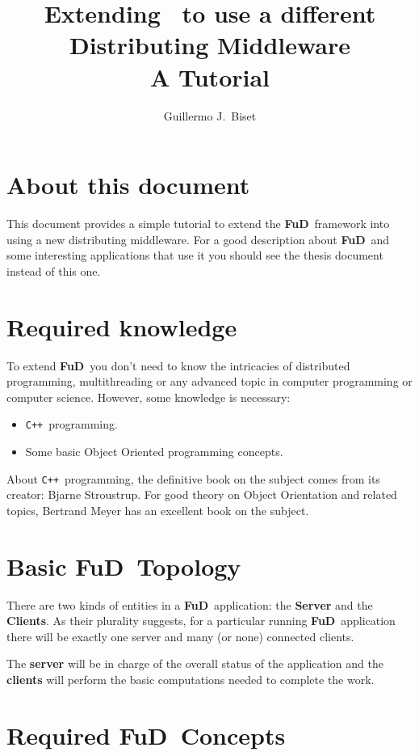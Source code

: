 \documentclass[a4paper,12pt,english]{article}
\title{Extending \fud \ to use a different Distributing Middleware\\ \small{A Tutorial}}
\author{Guillermo J.~Biset}
\newcommand{\fud}{\textbf{FuD}}
\newcommand{\cpp}{\texttt{C++}}
\begin{document}
\maketitle

\section{About this document}

This document provides a simple tutorial to extend the \fud \ framework into using a new distributing middleware. For a good description about \fud  \ and some interesting applications that use it you should see the thesis document instead of this one.

\section{Required knowledge}
To extend \fud \ you don't need to know the intricacies of distributed programming, multithreading or any advanced topic in computer programming or computer science. However, some knowledge is necessary:
\begin{itemize}
 \item \cpp \ programming.
 \item Some basic Object Oriented programming concepts.
\end{itemize}

About \cpp \ programming, the definitive book on the subject comes from its creator: Bjarne Stroustrup\cite{cplusplus}. For good theory on Object Orientation and related topics, Bertrand Meyer has an excellent book on the subject\cite{oosc}.

\section{Basic \fud \ Topology}

There are two kinds of entities in a \fud \ application: the \textbf{Server} and the \textbf{Clients}. As their plurality suggests, for a particular running \fud \ application there will be exactly one server and many (or none) connected clients.

The \textbf{server} will be in charge of the overall status of the application and the \textbf{clients} will perform the basic computations needed to complete the work.

\section{Required \fud \ Concepts}
\end{document}
